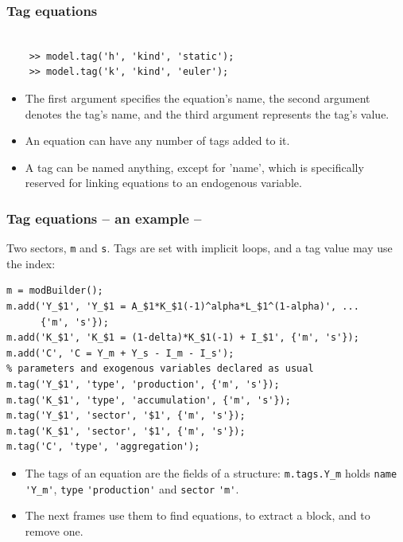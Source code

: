 \documentclass[10pt,slidestop]{beamer}
\theoremstyle{plain}
\begin{document}
\begin{frame}[c,fragile]
  \frametitle{Tag equations}

  \begin{lstlisting}[style=MatlabConsole]

    >> model.tag('h', 'kind', 'static');
    >> model.tag('k', 'kind', 'euler');
   \end{lstlisting}

   \bigskip

  \begin{itemize}

  \item The first argument specifies the equation's name, the second
    argument denotes the tag's name, and the third argument represents
    the tag's value.\newline

  \item An equation can have any number of tags added to it.\newline

  \item A tag can be named anything, except for 'name', which is
    specifically reserved for linking equations to an endogenous
    variable.\newline

  \end{itemize}

\end{frame}


\begin{frame}[fragile]
  \frametitle{Tag equations -- an example --}

  Two sectors, \verb+m+ and \verb+s+. Tags are set with implicit loops, and a tag
  value may use the index:

  \begin{lstlisting}[style=MatlabConsole,basicstyle=\ttfamily\scriptsize]
m = modBuilder();
m.add('Y_$1', 'Y_$1 = A_$1*K_$1(-1)^alpha*L_$1^(1-alpha)', ...
      {'m', 's'});
m.add('K_$1', 'K_$1 = (1-delta)*K_$1(-1) + I_$1', {'m', 's'});
m.add('C', 'C = Y_m + Y_s - I_m - I_s');
% parameters and exogenous variables declared as usual
m.tag('Y_$1', 'type', 'production', {'m', 's'});
m.tag('K_$1', 'type', 'accumulation', {'m', 's'});
m.tag('Y_$1', 'sector', '$1', {'m', 's'});
m.tag('K_$1', 'sector', '$1', {'m', 's'});
m.tag('C', 'type', 'aggregation');
  \end{lstlisting}

  \begin{itemize}
  \item The tags of an equation are the fields of a structure: \verb+m.tags.Y_m+ holds
    \verb+name+ \verb+'Y_m'+, \verb+type+ \verb+'production'+ and \verb+sector+ \verb+'m'+.
  \item The next frames use them to find equations, to extract a block, and to remove
    one.
  \end{itemize}

\end{frame}
\end{document}
